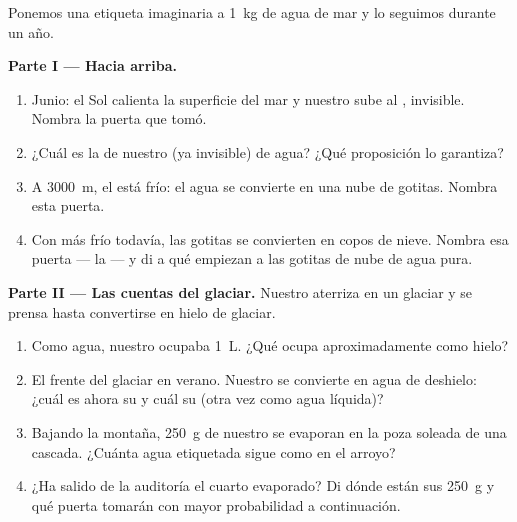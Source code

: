 \begin{problem}\label{pb:g6:water-states:1}
Ponemos una etiqueta imaginaria a \qty{1}{kg} de agua de mar y lo
seguimos durante un año.

\medskip\noindent\textbf{Parte I --- Hacia arriba.}
\begin{enumerate}
  \item Junio: el Sol calienta la superficie del mar y nuestro
         sube al , invisible. Nombra la puerta que
        tomó.
  \item ¿Cuál es la  de nuestro (ya invisible)  de
        agua? ¿Qué proposición lo garantiza?
  \item A \qty{3000}{m}, el  está frío: el agua se convierte en
        una nube de gotitas. Nombra esta puerta.
  \item Con más frío todavía, las gotitas se convierten en copos de
        nieve. Nombra esa puerta --- la  --- y di a
        qué  empiezan a  las gotitas de
        nube de agua pura.
\end{enumerate}

\medskip\noindent\textbf{Parte II --- Las cuentas del glaciar.}
Nuestro  aterriza en un glaciar y se prensa hasta
convertirse en hielo de glaciar.
\begin{enumerate}[resume]
  \item Como agua, nuestro  ocupaba \qty{1}{L}. ¿Qué
         ocupa aproximadamente como hielo?
  \item El frente del glaciar  en verano. Nuestro
         se convierte en agua de deshielo: ¿cuál es ahora su
         y cuál su  (otra vez como agua
        líquida)?
  \item Bajando la montaña, \qty{250}{g} de nuestro 
        se evaporan en la poza soleada de una cascada. ¿Cuánta agua
        etiquetada sigue como  en el arroyo?
  \item ¿Ha salido de la auditoría el cuarto evaporado? Di dónde
        están sus \qty{250}{g} y qué puerta tomarán con mayor
        probabilidad a continuación.
\end{enumerate}


\end{problem}
